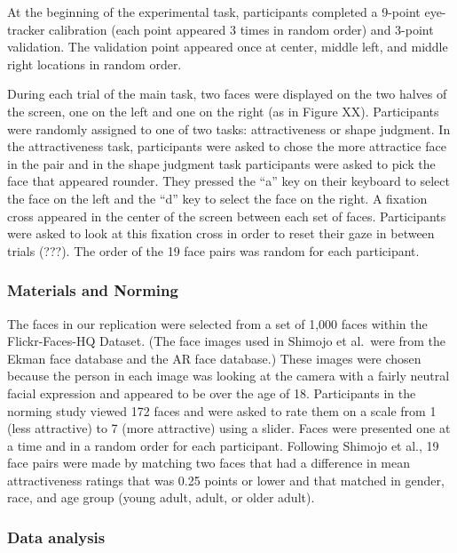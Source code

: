 \documentclass[
  english,
  man,floatsintext]{apa6}
\begin{document}
At the beginning of the experimental task, participants completed a 9-point eye-tracker calibration (each point appeared 3 times in random order) and 3-point validation. The validation point appeared once at center, middle left, and middle right locations in random order.

During each trial of the main task, two faces were displayed on the two halves of the screen, one on the left and one on the right (as in Figure XX). Participants were randomly assigned to one of two tasks: attractiveness or shape judgment. In the attractiveness task, participants were asked to chose the more attractice face in the pair and in the shape judgment task participants were asked to pick the face that appeared rounder. They pressed the ``a'' key on their keyboard to select the face on the left and the ``d'' key to select the face on the right. A fixation cross appeared in the center of the screen between each set of faces. Participants were asked to look at this fixation cross in order to reset their gaze in between trials (???). The order of the 19 face pairs was random for each participant.

\hypertarget{materials-and-norming}{%
\subsubsection{Materials and Norming}\label{materials-and-norming}}

The faces in our replication were selected from a set of 1,000 faces within the Flickr-Faces-HQ Dataset. (The face images used in Shimojo et al.~were from the Ekman face database and the AR face database.) These images were chosen because the person in each image was looking at the camera with a fairly neutral facial expression and appeared to be over the age of 18. Participants in the norming study viewed 172 faces and were asked to rate them on a scale from 1 (less attractive) to 7 (more attractive) using a slider. Faces were presented one at a time and in a random order for each participant. Following Shimojo et al., 19 face pairs were made by matching two faces that had a difference in mean attractiveness ratings that was 0.25 points or lower and that matched in gender, race, and age group (young adult, adult, or older adult).

\hypertarget{data-analysis-2}{%
\subsubsection{Data analysis}\label{data-analysis-2}}
\end{document}

